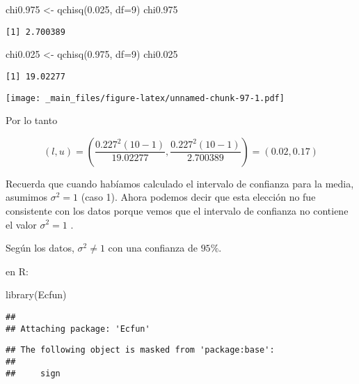 \documentclass[
]{book}
\newenvironment{Shaded}{\begin{snugshade}}{\end{snugshade}}
\newcommand{\AttributeTok}[1]{\textcolor[rgb]{0.77,0.63,0.00}{#1}}
\newcommand{\DecValTok}[1]{\textcolor[rgb]{0.00,0.00,0.81}{#1}}
\newcommand{\FloatTok}[1]{\textcolor[rgb]{0.00,0.00,0.81}{#1}}
\newcommand{\FunctionTok}[1]{\textcolor[rgb]{0.00,0.00,0.00}{#1}}
\newcommand{\NormalTok}[1]{#1}
\newcommand{\OtherTok}[1]{\textcolor[rgb]{0.56,0.35,0.01}{#1}}
\begin{document}
\begin{Shaded}
\begin{Highlighting}[]
\NormalTok{chi0}\FloatTok{.975} \OtherTok{\textless{}{-}} \FunctionTok{qchisq}\NormalTok{(}\FloatTok{0.025}\NormalTok{, }\AttributeTok{df=}\DecValTok{9}\NormalTok{)}
\NormalTok{chi0}\FloatTok{.975}
\end{Highlighting}
\end{Shaded}

\begin{verbatim}
[1] 2.700389
\end{verbatim}

\begin{Shaded}
\begin{Highlighting}[]
\NormalTok{chi0}\FloatTok{.025} \OtherTok{\textless{}{-}} \FunctionTok{qchisq}\NormalTok{(}\FloatTok{0.975}\NormalTok{, }\AttributeTok{df=}\DecValTok{9}\NormalTok{)}
\NormalTok{chi0}\FloatTok{.025}
\end{Highlighting}
\end{Shaded}

\begin{verbatim}
[1] 19.02277
\end{verbatim}

\texttt{[image: \_main\_files/figure-latex/unnamed-chunk-97-1.pdf]}

Por lo tanto

\[(l,u)= (\frac{0.227^2 (10-1)}{19.02277},\frac{0.227^2(10-1)}{2.700389})=(0.02,0.17)\]

Recuerda que cuando habíamos calculado el intervalo de confianza para la media, asumimos \(\sigma^2=1\) (caso 1). Ahora podemos decir que esta elección no fue consistente con los datos porque vemos que el intervalo de confianza no contiene el valor \(\sigma^2=1\) .

Según los datos, \(\sigma^2 \neq 1\) con una confianza de \(95\%\).

en R:

\begin{Shaded}
\begin{Highlighting}[]
\FunctionTok{library}\NormalTok{(Ecfun)}
\end{Highlighting}
\end{Shaded}

\begin{verbatim}
## 
## Attaching package: 'Ecfun'
\end{verbatim}

\begin{verbatim}
## The following object is masked from 'package:base':
## 
##     sign
\end{verbatim}
\end{document}
